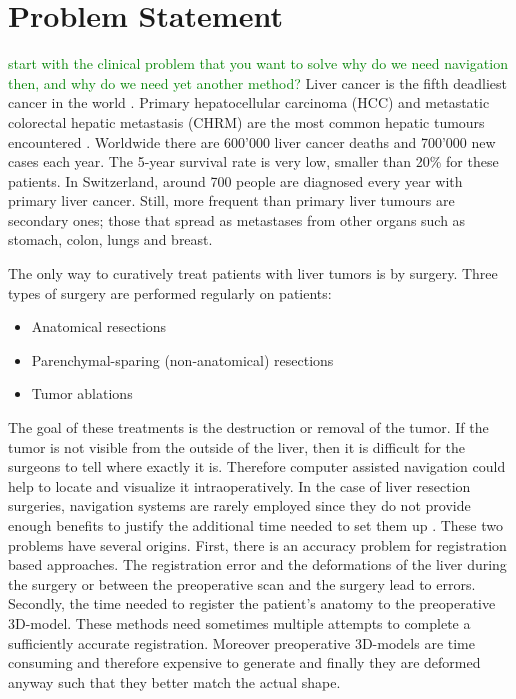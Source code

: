 \chapter{Problem Statement}
\textcolor{green}{start with the clinical problem that you want to solve}
\textcolor{green}{why do we need navigation then, and why do we need yet another method?}
Liver cancer is the fifth deadliest cancer in the world \cite{bray2018global}.
Primary hepatocellular carcinoma (HCC) and metastatic colorectal hepatic
metastasis (CHRM) are the most common hepatic tumours encountered \cite{north2014microwave}. Worldwide
there are 600'000 liver cancer deaths and 700'000 new cases each year.
The 5-year survival rate is very low, smaller than 20\% for these
patients. In Switzerland, around 700 people are diagnosed every year with
primary liver cancer. Still, more frequent than primary liver tumours are
secondary ones; those that spread as metastases from other organs such as stomach, colon,
lungs and breast. 

The only way to curatively treat patients with liver tumors is by surgery. Three types of surgery
are performed regularly on patients:
\begin{itemize}
  \item Anatomical resections
  \item Parenchymal-sparing (non-anatomical) resections
  \item Tumor ablations 
\end{itemize}
The goal of these treatments is the destruction or removal of the tumor. If the
tumor is not visible from the outside of the liver, then it is difficult for the
surgeons to tell where exactly it is. Therefore computer assisted navigation
could help to locate and visualize it intraoperatively.
In the case of liver resection surgeries, navigation systems are rarely employed
since they do not provide enough benefits to justify the additional time needed
to set them up \cite{beller2007image}. These two problems have several origins.
First, there is an accuracy problem for registration based approaches. The
registration error and the deformations of the liver during the surgery
\cite{clements2017deformation} or between the preoperative scan and the surgery
lead to errors. Secondly, the time needed to register the patient's anatomy to the
preoperative 3D-model. These methods need sometimes multiple attempts to complete
a sufficiently accurate registration. Moreover preoperative 3D-models are time
consuming and therefore expensive to generate and finally they are deformed
anyway such that they better match the actual shape.

